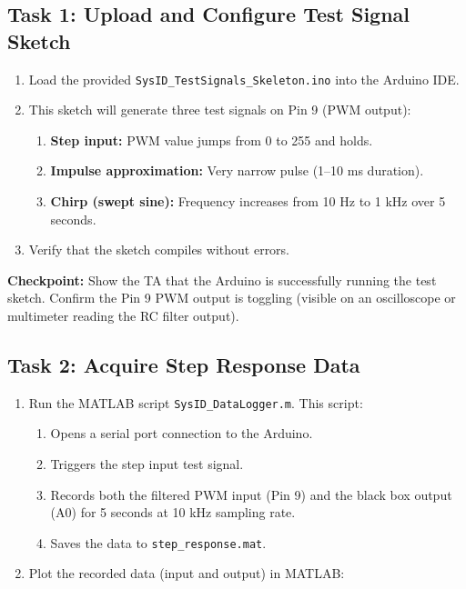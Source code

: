 \documentclass[11pt,letterpaper]{article}
\providecommand{\cpECE}[1]{\textcolor{OliveGreen}{\textbf{Checkpoint:} #1}}
\begin{document}
\subsection{Task 1: Upload and Configure Test Signal Sketch}

\begin{enumerate}
    \item Load the provided \texttt{SysID\_TestSignals\_Skeleton.ino} into the Arduino IDE.
    \item This sketch will generate three test signals on Pin 9 (PWM output):
        \begin{enumerate}
            \item \textbf{Step input:} PWM value jumps from 0 to 255 and holds.
            \item \textbf{Impulse approximation:} Very narrow pulse (1--10 ms duration).
            \item \textbf{Chirp (swept sine):} Frequency increases from 10 Hz to 1 kHz over 5 seconds.
        \end{enumerate}
    \item Verify that the sketch compiles without errors.
\end{enumerate}

\cpECE{Show the TA that the Arduino is successfully running the test sketch. Confirm the Pin 9 PWM output is toggling (visible on an oscilloscope or multimeter reading the RC filter output).}

\subsection{Task 2: Acquire Step Response Data}

\begin{enumerate}
    \item Run the MATLAB script \texttt{SysID\_DataLogger.m}. This script:
        \begin{enumerate}
            \item Opens a serial port connection to the Arduino.
            \item Triggers the step input test signal.
            \item Records both the filtered PWM input (Pin 9) and the black box output (A0) for 5 seconds at 10 kHz sampling rate.
            \item Saves the data to \texttt{step\_response.mat}.
        \end{enumerate}
    \item Plot the recorded data (input and output) in MATLAB:
\end{enumerate}
\end{document}

